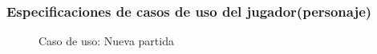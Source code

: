 \documentclass[12pt,twoside]{article}
\begin{document}
	
	
	\subsubsection{Especificaciones de casos de uso del jugador(personaje)}
	
	\begin{figure}[H]
		\centering
		\caption{Caso de uso:  Nueva partida}
		\label{diagrama: caso: nueva_partida}
	\end{figure}
	
\end{document}
